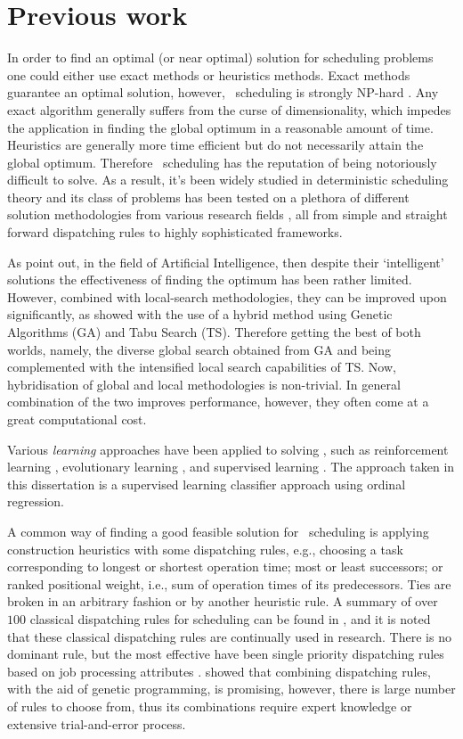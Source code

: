 \section{Previous work}
In order to find an optimal (or near optimal) solution for scheduling problems one could either use exact methods or heuristics methods. Exact methods guarantee an optimal solution, however, \jsp\ scheduling is strongly NP-hard \citep{Garey76:NPhard}. Any exact algorithm generally suffers from the curse of dimensionality, which impedes the application in finding the global optimum in a reasonable amount of time. Heuristics are generally more time efficient but do not necessarily attain the global optimum. Therefore \jsp\ scheduling 
has the reputation of being notoriously difficult to solve. As a result, it's been widely studied in deterministic scheduling theory and its class of problems has been tested on a plethora of different solution methodologies from various research fields \citep{Meeran12}, all from simple and straight forward dispatching rules to highly sophisticated frameworks.

As \cite{Meeran12} point out, in the field of Artificial Intelligence, then despite their `intelligent' solutions the effectiveness of finding the optimum has been rather limited. However, combined with local-search methodologies, they can be improved upon significantly, as \citeauthor{Meeran12} showed with the use of a hybrid method using Genetic Algorithms (GA) and Tabu Search (TS). Therefore getting the best of both worlds, namely, the diverse global search obtained from GA and being complemented with the intensified local search capabilities of TS. Now, hybridisation of global and local methodologies is non-trivial. In general combination of the two improves performance, however, they often come at a great computational cost.  

Various \emph{learning} approaches have been applied to solving \jsp, such as reinforcement learning \citep{Zhang95}, evolutionary learning \citep{Tay08}, and supervised learning \citep{Siggi05,Malik08}. The approach taken in this dissertation is a supervised learning classifier approach using ordinal regression. 


A common way of finding a good feasible solution for \jsp\ scheduling is applying construction heuristics with some dispatching rules, e.g., choosing a task corresponding to longest or shortest operation time; most or least successors; or ranked positional weight, i.e., sum of operation times of its predecessors. Ties are broken in an arbitrary fashion or by another heuristic rule.
A summary of over $100$ classical dispatching rules for scheduling can be found in \citet{Panwalkar77}, and it is noted that these classical dispatching rules are continually used in research.  
There is no dominant rule, but the most effective have been single priority dispatching rules based on job processing attributes \citep{Haupt89}. \citet{Tay08} showed that combining dispatching rules, with the aid of genetic programming, is promising, however, there is large number of rules to choose from, thus its combinations require expert knowledge or extensive trial-and-error process. 

